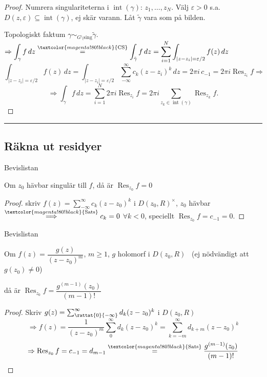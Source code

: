 \begin{proof}
Numrera singulariteterna i $\operatorname{int}(\gamma)$: $z_1, \dots, z_N$. Välj $\varepsilon > 0$ s.a.\ $D(z, \varepsilon) \subseteq \operatorname{int}(\gamma)$, ej skär varann. Låt $\tilde{\gamma}$ vara som på bilden.

Topologiskt faktum $\gamma \sim_{G \setminus \text{sing}} \tilde{\gamma}$. $\Rightarrow \displaystyle\int_\gamma f\,dz \overset{\textcolor{magenta!80!black}{\text{CS}}}{=} \int_{\tilde{\gamma}} f\,dz = \sum_{i = 1}^N \int_{|z - z_i| = \varepsilon/2} f(z)\,dz$
\[ \int_{|z - z_i| = \varepsilon/2} f(z)\,dz = \int_{|z - z_i| = \varepsilon/2} \sum_{-\infty}^\infty c_k(z - z_i)^k\,dz = 2\pi i\, c_{-1} = 2\pi i \operatorname{Res}_{z_i} f \Rightarrow \]
\[ \Rightarrow \int_\gamma f\,dz = \sum_{i = 1}^N 2\pi i \operatorname{Res}_{z_i} f = 2\pi i \sum_{z_k \in \operatorname{int}(\gamma)} \operatorname{Res}_{z_k} f. \]
\end{proof}

\noindent\rule{\linewidth}{0.4pt}

\subsection{Räkna ut residyer}
\begin{theorem}[Prop.\ 9.11a]
\hfill \textcolor{magenta!80!black}{Bevislistan}

Om $z_0$ hävbar singulär till $f$, då är $\operatorname{Res}_{z_0} f = 0$
\end{theorem}
\begin{proof}
skriv $f(z) = \sum_{-\infty}^\infty c_k(z - z_0)^k$ i $D(z_0, R)^\times$, $z_0$ hävbar $\overset{\textcolor{magenta!80!black}{\text{Sats}}}{\Longrightarrow} c_k = 0$ $\forall k < 0$, speciellt $\operatorname{Res}_{z_0} f = c_{-1} = 0$.
\end{proof}

\begin{theorem}[Prop 1.3.R]
\hfill \textcolor{magenta!80!black}{Bevislistan}

Om $f(z) = \dfrac{g(z)}{(z - z_0)^m}$, $m \ge 1$, $g$ holomorf i $D(z_0, R)$ \ (ej nödvändigt att $g(z_0) \neq 0$)

då är $\operatorname{Res}_{z_0} f = \dfrac{g^{(m-1)}(z_0)}{(m - 1)!}$
\end{theorem}
\begin{proof}
Skriv $g(z) = \sum_{\rattat{0}{-\infty}}^\infty d_k(z - z_0)^k$ i $D(z_0, R)$
\[ \Rightarrow f(z) = \frac{1}{(z - z_0)^m} \sum_0^\infty d_k(z - z_0)^k = \sum_{k = -m}^\infty d_{k+m}(z - z_0)^k \]
\[ \Rightarrow \operatorname{Res}_{z_0} f = c_{-1} = d_{m-1} \overset{\textcolor{magenta!80!black}{\text{Sats}}}{=} \frac{g^{(m-1)}(z_0)}{(m - 1)!} \]
\end{proof}

